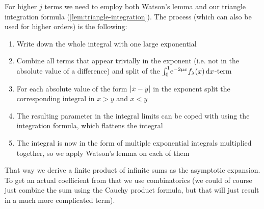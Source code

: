 For higher $j$ terms we need to employ both Watson's lemma and our triangle
integration formula (\cref{lem:triangle-integration}). The process (which can
also be used for higher orders) is the following:
\begin{enumerate}
  \item Write down the whole integral with one large exponential
  \item Combine all terms that appear trivially in the exponent (i.e. not in the
    absolute value of a difference) and split of the $\Int{x}{\Eto{-2\mu
    x}f_\lambda(x)}$-term
  \item For each absolute value of the form $\Abs{x-y}$ in the exponent split
    the corresponding integral in $x > y$ and $x < y$
  \item The resulting parameter in the integral limits can be coped with using
    the integration formula, which flattens the integral
  \item The integral is now in the form of multiple exponential integrals
    multiplied together, so we apply Watson's lemma on each of them
\end{enumerate}
That way we derive a finite product of infinite sums as the asymptotic
expansion. To get an actual coefficient from that we use combinatorics (we could
of course just combine the sum using the Cauchy product formula, but that will
just result in a much more complicated term).

